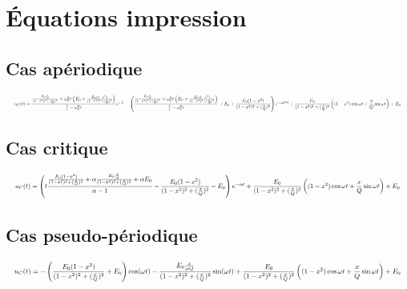 \documentclass[a4paper,french,bookmarks]{article}
\begin{document}

\section{Équations impression}

\subsection{Cas apériodique}
\[ \resizebox{1\hsize}{!}{$
                u_C(t) = \dfrac{\frac{E_0\frac{x}{Q}}{(1-x^2)^2 + (\frac{x}{Q})^2} + \omega_0^2\tau\left(E_0 + \frac{E_0(1-x^2)}{(1-x^2)^2 + (\frac{x}{Q})^2}\right)}{\frac{1}{\tau} - \omega_0^2\tau}e^{-\frac{t}{\tau}} - \left(\dfrac{\frac{E_0\frac{x}{Q}}{(1-x^2)^2 + (\frac{x}{Q})^2} + \omega_0^2\tau\left(E_0 + \frac{E_0(1-x^2)}{(1-x^2)^2 + (\frac{x}{Q})^2}\right)}{\frac{1}{\tau} - \omega_0^2\tau}+ E_0 + \dfrac{E_0(1-x^2)}{(1-x^2)^2 + (\frac{x}{Q})^2} \right)e^{-\omega_0^2\tau t} + \dfrac{E_0}{(1-x^2)^2 + (\frac{x}{Q})^2}\left((1-x^2)\cos{\omega t} + \dfrac{x}{Q}\sin{\omega t}\right) + E_0
            $}\]

\subsection{Cas critique}
\[ \resizebox{\hsize}{!}{$
                u_C(t) = \left(t\dfrac{\frac{E_0(1-x^2)}{(1-x^2)^2 + (\frac{x}{Q})^2} + \alpha \frac{E_0\frac{x}{Q}}{(1-x^2)^2 + (\frac{x}{Q})^2} + \alpha E_0}{\alpha -1}-\dfrac{E_0(1-x^2)}{(1-x^2)^2 + (\frac{x}{Q})^2} - E_0\right)e^{-\alpha t} + \dfrac{E_0}{(1-x^2)^2 + (\frac{x}{Q})^2}\left((1-x^2)\cos{\omega t} + \dfrac{x}{Q}\sin{\omega t}\right) + E_0
            $}\]
            
\subsection{Cas pseudo-périodique}
\[ \resizebox{\hsize}{!}{$u_C(t) = -\left(\dfrac{E_0(1-x^2)}{(1-x^2)^2 + (\frac{x}{Q})^2} + E_0\right)\cos(\omega t) -\dfrac{E_0\frac{x}{\omega Q}}{(1-x^2)^2 + (\frac{x}{Q})^2}\sin(\omega t)
                + \dfrac{E_0}{(1-x^2)^2 + (\frac{x}{Q})^2}\left((1-x^2)\cos{\omega t} + \dfrac{x}{Q}\sin{\omega t}\right) + E_0
            $} \]
\end{document}
